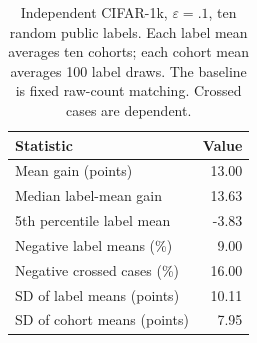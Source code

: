 \begin{table}[t]
\caption{Independent CIFAR-1k, $\varepsilon=.1$, ten random public labels. Each label mean averages ten cohorts; each cohort mean averages 100 label draws. The baseline is fixed raw-count matching. Crossed cases are dependent.}
\label{tab:gain-distribution}\small
\centering
\begin{tabular}{@{}lr@{}}\toprule
Statistic & Value \\
\midrule
Mean gain (points) & 13.00 \\
Median label-mean gain & 13.63 \\
5th percentile label mean & -3.83 \\
Negative label means (\%) & 9.00 \\
Negative crossed cases (\%) & 16.00 \\
SD of label means (points) & 10.11 \\
SD of cohort means (points) & 7.95 \\
\bottomrule\end{tabular}
\end{table}
